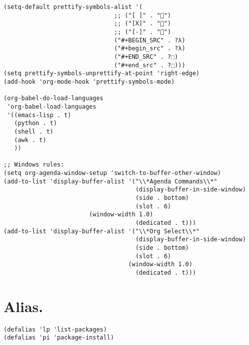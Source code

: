 \documentclass[11pt]{article}
\begin{document}
\begin{verbatim}
(setq-default prettify-symbols-alist '(
                               ;; ("[ ]" . "")
                               ;; ("[X]" . "")
                               ;; ("[-]" . "")
                               ("#+BEGIN_SRC" . ?λ)
                               ("#+begin_src" . ?λ)
                               ("#+END_SRC" . ?⬚)
                               ("#+end_src" . ?⬚)))
(setq prettify-symbols-unprettify-at-point 'right-edge)
(add-hook 'org-mode-hook 'prettify-symbols-mode)

(org-babel-do-load-languages
 'org-babel-load-languages
 '((emacs-lisp . t)
   (python . t)
   (shell . t) 
   (awk . t)
   ))

;; Windows rules:
(setq org-agenda-window-setup 'switch-to-buffer-other-window)
(add-to-list 'display-buffer-alist '("\\*Agenda Commands\\*"
                                     (display-buffer-in-side-window)
                                     (side . bottom)
                                     (slot . 6)
                        (window-width 1.0)
                                     (dedicated . t)))
(add-to-list 'display-buffer-alist '("\\*Org Select\\*"
                                     (display-buffer-in-side-window)
                                     (side . bottom)
                                     (slot . 6)
                                   (window-width 1.0)
                                     (dedicated . t)))
\end{verbatim}
\section{Alias.}
\label{sec:orgea6ce20}
\begin{verbatim}
(defalias 'lp 'list-packages)
(defalias 'pi 'package-install)
\end{verbatim}
\end{document}
